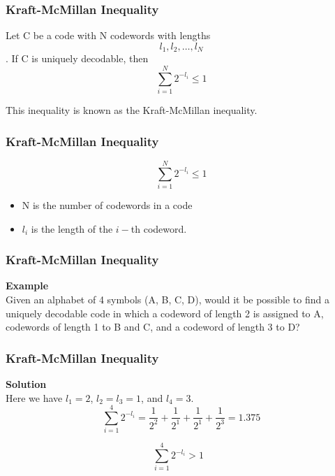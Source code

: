 \documentclass{beamer}
\begin{document}
\begin{frame}
\Large
\frametitle{Kraft-McMillan Inequality}
	
	
Let C be a code with N codewords with lengths \[l_1 , l_2 , \ldots , l_N\]. 
\bigskip
If
C is uniquely decodable, then
\[\sum_{i=1}^{N} 2^{-l_i} \leq 1 \]

This inequality is known as the Kraft-McMillan inequality.

\end{frame}
\begin{frame}
	\Large
	\frametitle{Kraft-McMillan Inequality}
\vspace{-2.5cm}	
{
	\LARGE
\[\sum_{i=1}^{N} 2^{-l_i} \leq 1 \]
}
\begin{itemize} 
\item N is the number of codewords in a code
\item $l_i$ is the length of
the $i-$th codeword.
\end{itemize}
\end{frame}

\begin{frame}
	\Large
	\frametitle{Kraft-McMillan Inequality}
	\vspace{-1cm}
\textbf{Example}\\ Given an alphabet of 4 symbols (A, B, C, D), would it be
possible to find a uniquely decodable code in which a codeword of length 2 is
assigned to A, codewords of length 1 to B and C, and a codeword of length 3 to D?


\end{frame}

\begin{frame}
	\Large
	\frametitle{Kraft-McMillan Inequality}
	
\textbf{Solution}\\
 Here we have $l_1 = 2$, $l_2 = l_3 = 1$, and $l_4 = 3$.
 \bigskip
\[\sum_{i=1}^{4} 2^{-l_i} = \frac{1}{2^2} + \frac{1}{2^1} + \frac{1}{2^1} + \frac{1}{2^3}  = 1.375\]

\bigskip
\[ \sum_{i=1}^{4} 2^{-l_i} > 1 \mbox{     } \]

\end{frame}


\begin{frame}
\end{frame}
\end{document}
